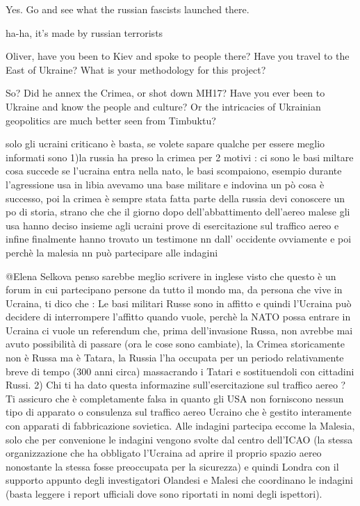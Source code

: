 \begin{itemize}
\begin{itemize}

Yes. Go and see what the russian fascists launched there.


ha-ha, it's made by russian terrorists

\end{itemize} %


Oliver, have you been to Kiev and spoke to people there? Have you travel to the
East of Ukraine? What is your methodology for this project?

\begin{itemize} %

So? Did he annex the Crimea, or shot down MH17? Have you ever been to Ukraine
and know the people and culture? Or the intricacies of Ukrainian geopolitics
are much better seen from Timbuktu?


solo gli ucraini criticano è basta, se volete sapare qualche per essere meglio
informati sono 1)la russia ha preso la crimea per 2 motivi : ci sono le basi
miltare cosa succede se l'ucraina entra nella nato, le basi scompaiono, esempio
durante l'agressione usa in libia avevamo una base militare e indovina un pò
cosa è successo, poi la crimea è sempre stata fatta parte della russia devi
conoscere un po di storia, strano che che il giorno dopo dell'abbattimento
dell'aereo malese gli usa hanno deciso insieme agli ucraini prove di
esercitazione sul traffico aereo e infine finalmente hanno trovato un testimone
nn dall' occidente ovviamente e poi perchè la malesia nn può partecipare alle
indagini


@Elena Selkova penso sarebbe meglio scrivere in inglese visto che questo è un
forum in cui partecipano persone da tutto il mondo ma, da persona che vive in
Ucraina, ti dico che : Le basi militari Russe sono in affitto e quindi
l'Ucraina può decidere di interrompere l'affitto quando vuole, perchè la NATO
possa entrare in Ucraina ci vuole un referendum che, prima dell'invasione
Russa, non avrebbe mai avuto possibilità di passare (ora le cose sono
cambiate), la Crimea storicamente non è Russa ma è Tatara, la Russia l'ha
occupata per un periodo relativamente breve di tempo (300 anni circa)
massacrando i Tatari e sostituendoli con cittadini Russi. 2) Chi ti ha dato
questa informazine sull'esercitazione sul traffico aereo ? Ti assicuro che è
completamente falsa in quanto gli USA non forniscono nessun tipo di apparato o
consulenza sul traffico aereo Ucraino che è gestito interamente con apparati di
fabbricazione sovietica. Alle indagini partecipa eccome la Malesia, solo che
per convenione le indagini vengono svolte dal centro dell'ICAO (la stessa
organizzazione che ha obbligato l'Ucraina ad aprire il proprio spazio aereo
nonostante la stessa fosse preoccupata per la sicurezza) e quindi Londra con il
supporto appunto degli investigatori Olandesi e Malesi che coordinano le
indagini (basta leggere i report ufficiali dove sono riportati in nomi degli
ispettori).


\end{itemize}
\end{itemize}
